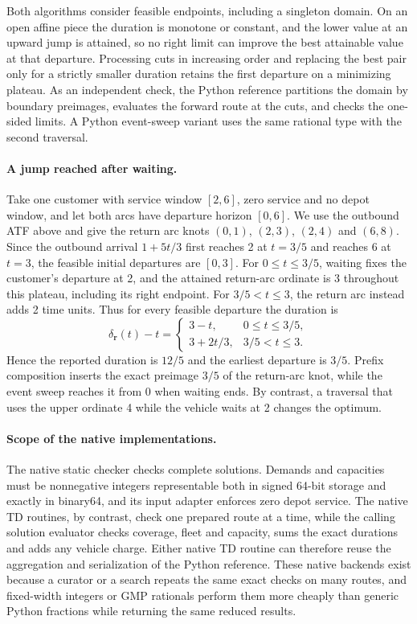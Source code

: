 Both algorithms consider feasible endpoints, including a singleton domain. On an open affine piece the duration is monotone or constant, and the lower value at an upward jump is attained, so no right limit can improve the best attainable value at that departure. Processing cuts in increasing order and replacing the best pair only for a strictly smaller duration retains the first departure on a minimizing plateau. As an independent check, the Python  reference partitions the domain by boundary preimages, evaluates the forward route at the cuts, and checks the one-sided limits. A Python event-sweep variant uses the same rational type with the second traversal.

\paragraph{A jump reached after waiting.}
Take one customer with service window $[2,6]$, zero service and no depot window, and let both arcs have departure horizon $[0,6]$. We use the outbound ATF above and give the return arc knots $(0,1)$, $(2,3)$, $(2,4)$ and $(6,8)$. Since the outbound arrival $1+5t/3$ first reaches 2 at $t=3/5$ and reaches 6 at $t=3$, the feasible initial departures are $[0,3]$. For $0\leq t\leq3/5$, waiting fixes the customer's departure at 2, and the attained return-arc ordinate is 3 throughout this plateau, including its right endpoint. For $3/5<t\leq3$, the return arc instead adds 2 time units. Thus for every feasible departure the duration is
\[
 \delta_{\mathbf r}(t)-t=
 \begin{cases}
 3-t, & 0\leq t\leq3/5,\\
 3+2t/3, & 3/5<t\leq3 .
 \end{cases}
\]
Hence the reported duration is $12/5$ and the earliest departure is $3/5$. Prefix composition inserts the exact preimage $3/5$ of the return-arc knot, while the event sweep reaches it from 0 when waiting ends. By contrast, a traversal that uses the upper ordinate 4 while the vehicle waits at 2 changes the optimum.

\paragraph{Scope of the native implementations.}
The native static checker checks complete solutions. Demands and capacities must be nonnegative integers representable both in signed 64-bit storage and exactly in binary64, and its input adapter enforces zero depot service. The native TD routines, by contrast, check one prepared route at a time, while the calling solution evaluator checks coverage, fleet and capacity, sums the exact durations and adds any vehicle charge. Either native TD routine can therefore reuse the aggregation and serialization of the Python reference. These native backends exist because a curator or a search repeats the same exact checks on many routes, and fixed-width integers or GMP rationals perform them more cheaply than generic Python fractions while returning the same reduced results.
